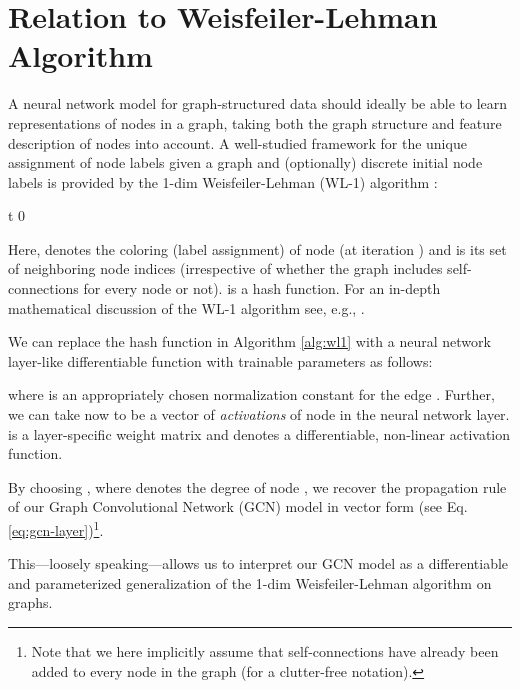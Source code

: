 \documentclass{article} \usepackage{iclr2017_conference,times}
\makeatletter
\newcommand*{\eg}{e.g.\@\xspace}
\newcommand*{\eq}{Eq.\@\xspace}
\makeatother
\begin{document}





\appendix

\section{Relation to Weisfeiler-Lehman Algorithm}
\label{sec:wl}
A neural network model for graph-structured data should ideally be able to learn representations of nodes in a graph, taking both the graph structure and feature description of nodes into account. A well-studied framework for the unique assignment of node labels given a graph and (optionally) discrete initial node labels is provided by the 1-dim Weisfeiler-Lehman (WL-1) algorithm  \citep{weisfeiler1968reduction}:

\begin{algorithm}[H]
t  0\;
    \caption{{\bf WL-1 algorithm \citep{weisfeiler1968reduction}} \label{alg:wl1}}
\end{algorithm}

Here,  denotes the coloring (label assignment) of node  (at iteration ) and  is its set of neighboring node indices (irrespective of whether the graph includes self-connections for every node or not).  is a hash function. For an in-depth mathematical discussion of the WL-1 algorithm see, \eg, \cite{douglas2011weisfeiler}.

We can replace the hash function in Algorithm \ref{alg:wl1} with a neural network layer-like differentiable function with trainable parameters as follows:

where  is an appropriately chosen normalization constant for the edge . Further, we can take  now to be a vector of \emph{activations} of node  in the  neural network layer.  is a layer-specific weight matrix and  denotes a differentiable, non-linear activation function.

By choosing , where  denotes the degree of node , we recover the propagation rule of our Graph Convolutional Network (GCN) model in vector form (see \eq \ref{eq:gcn-layer})\footnote{Note that we here implicitly assume that self-connections have already been added to every node in the graph (for a clutter-free notation).}.

This---loosely speaking---allows us to interpret our GCN model as a differentiable and parameterized generalization of the 1-dim Weisfeiler-Lehman algorithm on graphs.
\end{document}
